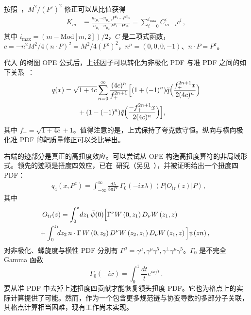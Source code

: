 按照~\cite{Chen:2016utp}，$M^2/(P^z)^2$ 修正可以从比值获得
%
\begin{align}
	K_m  &\equiv
	\frac{n_{(\mu_1}\cdots n_{\mu_m)}
		P^{\mu_1}\cdots P^{\mu_m}}{n_{\mu_1}\cdots n_{\mu_m}
		P^{\mu_1}\cdots P^{\mu_m}} = \sum_{i=0}^{i_\text{max}} C_{m-i}^i c^i   \label{Kn}\,,
\end{align}
其中 $i_\text{max}=(m-\text{Mod}[m,2])/2$，$C$ 是二项式函数，$c=-n^2 M^2/4\left(n\cdot P\right)^2 = M^2/4 (P^z)^2$，$n^\mu = (0,0,0,-1)$、$n \cdot P=P^z$。

代入  的树图 OPE 公式后，上述因子可以转化为非极化 PDF 与准 PDF 之间的如下关系~\cite{Chen:2016utp}：
\begin{align}
	q(x)&=\sqrt{1+4c}\sum_{n=0}^\infty \frac{(4c)^n}{f_+^{2n+1}}\Big[(1+(-1)^n)\tilde q\Big(\frac{f_+^{2n+1}x}{2(4c)^n}\Big)\nonumber\\
	&\qquad+(1-(-1)^n)\tilde q\Big(\frac{-f_+^{2n+1}x}{2(4c)^n}\Big)\Big],
\end{align}
其中 $f_{+}=\sqrt{1+4c}+ 1$。值得注意的是，上式保持了夸克数守恒。纵向与横向极化准 PDF 的靶质量修正可以类比导出。

 右端的迹部分是真正的高扭度效应。可以尝试从 OPE 构造高扭度算符的非局域形式。领先的迹项是扭度四效应，已在~\cite{Chen:2016utp}研究（另见~\cite{Balitsky:1987bk}），并被证明给出一个扭度四 PDF：
\begin{align}\label{tildeq-twist4}
	&{q}_\text{4}(x,P^z)
	=  \int_{-\infty}^\infty \!\frac{d\lambda}{8\pi P^z}\,
	\Gamma_0\left(-ix\lambda\right)
	\left\langle P\left\vert  O_\text{tr}(z)\right\vert P\right\rangle ,
\end{align}
其中
\begin{align}
	&O_\text{tr}(z) =
	\int_0^z \!dz_1\, \bar{\psi}(0) \Big[
	\Gamma^\nu W\left(0,z_1\right) D_\nu W\left(z_1,z\right)\\
	&\hspace{-.5em}+ \int_0^{z_1} \!\! \! dz_2\,  n \cdot  \Gamma\,
	W\left(0,z_2\right) D^\nu W\left(z_2,z_1\right) D_\nu
	W\left(z_1,z\right) \Big] \psi(z n)\,,\nonumber
\end{align}
对非极化、螺旋度与横性 PDF 分别有 $\Gamma^{\mu}=\gamma^{\mu}, \gamma^{\mu}\gamma^5, \gamma^\perp\gamma^{\mu}\gamma^5$。$\Gamma_0$ 是不完全 Gamma 函数
\begin{equation}
	\Gamma_0\left(-ix\right) = \int_0^1 \frac{dt}{t} e^{ix/t} \,.
\end{equation}
要从准 PDF 中去掉上述扭度四贡献才能恢复领头扭度 PDF。它也为格点上的实际计算提供了可能。然而，作为一个包含更多规范链与协变导数的多部分子关联，其格点计算相当困难，现有工作尚未实现。


